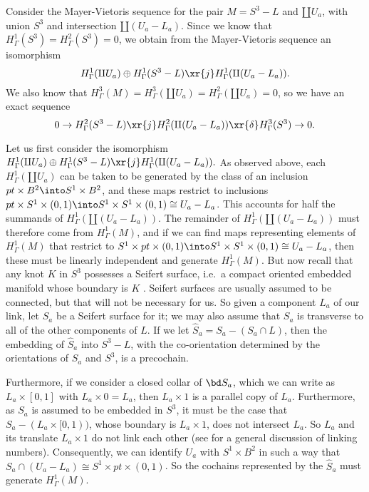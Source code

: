 \begin{example}
Consider the Mayer-Vietoris sequence for the pair $M = S^3 - L$ and $\amalg U_a$, with union $S^3$ and intersection $\amalg (U_a - L_a)$.
Since we know that $H^1_\Gamma(S^3) = H^2_\Gamma(S^3)=0$, we obtain from the Mayer-Vietoris sequence an isomorphism
$$H^1_\Gamma(\amalg U_a) \oplus H^1_\Gamma(S^3 - L) \xr{j} H^1_\Gamma( \amalg(U_a - L_a)).$$
We also know that $H^3_\Gamma(M) = H^3_\Gamma(\amalg U_a) = H^2_\Gamma(\amalg U_a) = 0$, so we have an exact sequence
$$0 \to H^2_\Gamma(S^3 - L) \xr{j} H^2_\Gamma( \amalg(U_a - L_a)) \xr{\delta} H^3_\Gamma(S^3) \to 0.$$

Let us first consider the isomorphism $H^1_\Gamma(\amalg U_a) \oplus H^1_\Gamma(S^3 - L) \xr{j} H^1_\Gamma( \amalg(U_a - L_a)).$
As observed above, each $H^1_\Gamma(\amalg U_a)$ can be taken to be generated by the class of an inclusion
$pt \times B^2 \into S^1 \times B^2$, and these maps restrict to inclusions $pt \times S^1 \times (0,1)  \into S^1 \times S^1 \times (0,1) \cong U_a - L_a$.
This accounts for half the summands of $H^1_\Gamma( \amalg(U_a - L_a))$.
The remainder of $H^1_\Gamma( \amalg(U_a - L_a))$ must therefore come from $H^1_\Gamma(M)$, and if we can find maps representing elements of $H^1_\Gamma(M)$ that restrict to $S^1 \times pt \times (0,1)  \into S^1 \times S^1 \times (0,1) \cong U_a - L_a$, then these must be linearly independent and generate $H^1_\Gamma(M)$.
But now recall that any knot $K$ in $S^3$ possesses a Seifert surface, i.e.\ a compact oriented embedded manifold whose boundary is $K$ \cite{REF FOR SMOOTH}.
Seifert surfaces are usually assumed to be connected, but that will not be necessary for us.
So given a component $L_a$ of our link, let $S_a$ be a Seifert surface for it; we may also assume that $S_a$ is transverse to all of the other components of $L$.
If we let $\hat S_a = S_a - (S_a \cap L)$, then the embedding of $\hat S_a$ into $S^3 - L$, with the co-orientation determined by the orientations of $S_a$ and $S^3$, is a precochain.

Furthermore, if we consider a closed collar of $\bd S_a$, which we can write as $L_a \times [0,1]$ with $L_a \times 0 = L_a$, then $L_a \times 1$ is a parallel copy of $L_a$.
Furthermore, as $S_a$ is assumed to be embedded in $S^3$, it must be the case that $S_a - (L_a \times [0,1))$, whose boundary is $L_a \times 1$, does not intersect $L_a$. So $L_a$ and its translate $L_a \times 1$ do not link each other (see \cite[Section 5.D]{Ro76} for a general discussion of linking numbers).
Consequently, we can identify $U_a$ with $S^1 \times B^2$ in such a way that $S_a \cap (U_a-L_a) \cong S^1 \times pt \times (0,1)$.
So the cochains represented by the $\hat S_a$ must generate $H^1_\Gamma(M)$.


\end{example}
